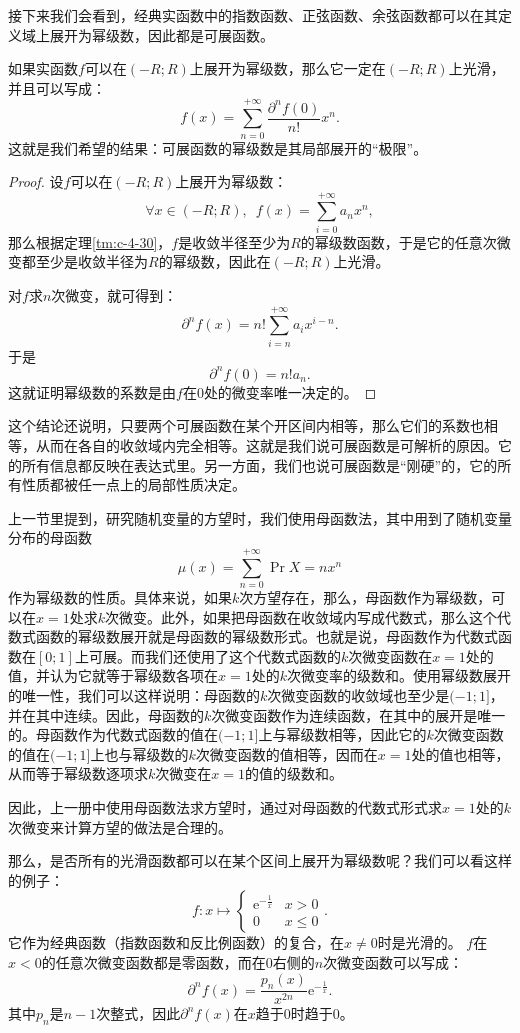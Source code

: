 \documentclass[12pt,UTF8]{ctexbook}
\begin{document}
\begin{appendix}
接下来我们会看到，经典实函数中的指数函数、正弦函数、余弦函数都可以在其定义域上展开为幂级数，因此都是可展函数。

如果实函数$f$可以在$(-R;R)$上展开为幂级数，那么它一定在$(-R;R)$上光滑，并且可以写成：
$$ f(x) = \sum_{n=0}^{+\infty} \frac{\partial^n f(0)}{n!} x^n. $$
这就是我们希望的结果：可展函数的幂级数是其局部展开的“极限”。

\begin{proof}
    设$f$可以在$(-R;R)$上展开为幂级数：
    $$\forall x\in (-R;R),\,\,\, f(x) = \sum_{i=0}^{+\infty} a_n x^n,$$
    那么根据定理\ref{tm:c-4-30}，$f$是收敛半径至少为$R$的幂级数函数，于是它的任意次微变都至少是收敛半径为$R$的幂级数，因此在$(-R;R)$上光滑。

    对$f$求$n$次微变，就可得到：
    $$ \partial^n f(x) = n! \sum_{i=n}^{+\infty} a_i x^{i-n}. $$
    于是
    $$ \partial^n f(0) = n! a_n. $$
    这就证明幂级数的系数是由$f$在$0$处的微变率唯一决定的。
\end{proof}

这个结论还说明，只要两个可展函数在某个开区间内相等，那么它们的系数也相等，从而在各自的收敛域内完全相等。这就是我们说可展函数是可解析的原因。它的所有信息都反映在表达式里。另一方面，我们也说可展函数是“刚硬”的，它的所有性质都被任一点上的局部性质决定。

上一节里提到，研究随机变量的方望时，我们使用母函数法，其中用到了随机变量分布的母函数
$$ \mu(x) = \sum_{n=0}^{+\infty} \Pr{X=n} x^n $$
作为幂级数的性质。具体来说，如果$k$次方望存在，那么，母函数作为幂级数，可以在$x=1$处求$k$次微变。此外，如果把母函数在收敛域内写成代数式，那么这个代数式函数的幂级数展开就是母函数的幂级数形式。也就是说，母函数作为代数式函数在$[0;1]$上可展。而我们还使用了这个代数式函数的$k$次微变函数在$x=1$处的值，并认为它就等于幂级数各项在$x=1$处的$k$次微变率的级数和。使用幂级数展开的唯一性，我们可以这样说明：母函数的$k$次微变函数的收敛域也至少是$(-1;1]$，并在其中连续。因此，母函数的$k$次微变函数作为连续函数，在其中的展开是唯一的。母函数作为代数式函数的值在$(-1;1]$上与幂级数相等，因此它的$k$次微变函数的值在$(-1;1]$上也与幂级数的$k$次微变函数的值相等，因而在$x=1$处的值也相等，从而等于幂级数逐项求$k$次微变在$x=1$的值的级数和。

因此，上一册中使用母函数法求方望时，通过对母函数的代数式形式求$x=1$处的$k$次微变来计算方望的做法是合理的。

那么，是否所有的光滑函数都可以在某个区间上展开为幂级数呢？我们可以看这样的例子：
$$ f: x\mapsto \begin{cases} \mathrm{e}^{-\frac{1}{x}} & x > 0 \\ 0 & x \leqslant 0 \end{cases}.$$
它作为经典函数（指数函数和反比例函数）的复合，在$x\neq 0$时是光滑的。
$f$在$x<0$的任意次微变函数都是零函数，而在$0$右侧的$n$次微变函数可以写成：
$$ \partial^n f(x) = \frac{p_n(x)}{x^{2n}} \mathrm{e}^{-\frac{1}{x}}.$$
其中$p_n$是$n-1$次整式，因此$\partial^n f(x)$在$x$趋于$0$时趋于$0$。


\end{appendix}
\end{document}
